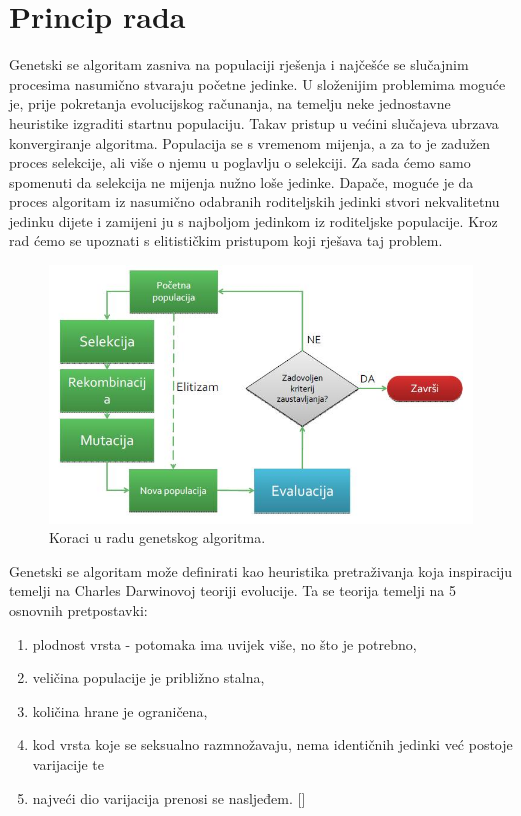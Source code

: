 \documentclass[times, utf8, zavrsni]{fer}
\begin{document}
	\section{Princip rada}
	
	Genetski se algoritam zasniva na populaciji rješenja i najčešće se slučajnim procesima nasumično stvaraju početne jedinke. U složenijim problemima moguće je, prije pokretanja evolucijskog računanja, na temelju neke jednostavne heuristike izgraditi startnu populaciju. Takav pristup u većini slučajeva ubrzava konvergiranje algoritma. Populacija se s vremenom mijenja, a za to je zadužen proces selekcije, ali više o njemu u poglavlju o selekciji. Za sada ćemo samo spomenuti da selekcija ne mijenja nužno loše jedinke. Dapače, moguće je da proces algoritam iz nasumično odabranih roditeljskih jedinki stvori nekvalitetnu jedinku dijete i zamijeni ju s najboljom jedinkom iz roditeljske populacije. Kroz rad ćemo se upoznati s elitističkim pristupom koji rješava taj problem. \\
	
	\begin{figure}[!htb]
		\centering
		\includegraphics[width=15cm]{slike/genetskiGeneral.jpg}
		\caption{Koraci u radu genetskog algoritma. }
		\label{fig:genetic-general}
	\end{figure}
	
	Genetski se algoritam može definirati kao heuristika pretraživanja koja inspiraciju temelji na Charles Darwinovoj teoriji evolucije. Ta se teorija temelji na 5 osnovnih pretpostavki: 
	\begin{enumerate}
		\item plodnost vrsta - potomaka ima uvijek više, no što je potrebno,
		\item veličina populacije je približno stalna,
		\item količina hrane je ograničena,
		\item kod vrsta koje se seksualno razmnožavaju, nema identičnih jedinki već postoje varijacije te
		\item najveći dio varijacija prenosi se nasljeđem. [\citep{PIOA}]
		
	\end{enumerate}
	
\end{document}
